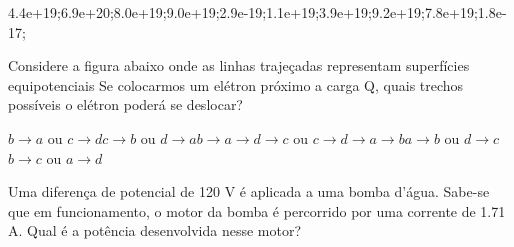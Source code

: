\documentclass[12pt, addpoints]{exam}
\begin{document}
\begin{questions}
\begin{multicols*}{2}
\begin{oneparchoices}
\choice 4.4e+19;\choice 6.9e+20;\choice 8.0e+19;\choice 9.0e+19;\choice 2.9e-19;\choice 1.1e+19;\choice 3.9e+19;\choice 9.2e+19;\choice 7.8e+19;\choice 1.8e-17;\end{oneparchoices}
\question[20] Considere a figura abaixo onde as linhas trajeçadas representam superfícies equipotenciais Se colocarmos um elétron próximo a carga Q, quais trechos possíveis o elétron poderá se deslocar?
        
        \begin{center}
            \begin{minipage}[c]{0.5\linewidth}
            \end{minipage}
        \end{center}
        
        

\begin{choices}
\choice $b\rightarrow a$ ou $c\rightarrow d$\choice $c\rightarrow b$ ou $d\rightarrow a$\choice $b\rightarrow a\rightarrow d\rightarrow c$ ou $c\rightarrow d\rightarrow a\rightarrow b$\choice $a\rightarrow b$ ou $d\rightarrow c$\choice $b\rightarrow c$ ou $a\rightarrow d$\end{choices}
\question[20] Uma diferença de potencial de 120 V é aplicada a uma bomba d’água. Sabe-se que em funcionamento, o motor da bomba é percorrido por uma corrente de    1.71 A. Qual é a potência desenvolvida nesse motor?


\end{multicols*}
\end{questions}
\end{document}
